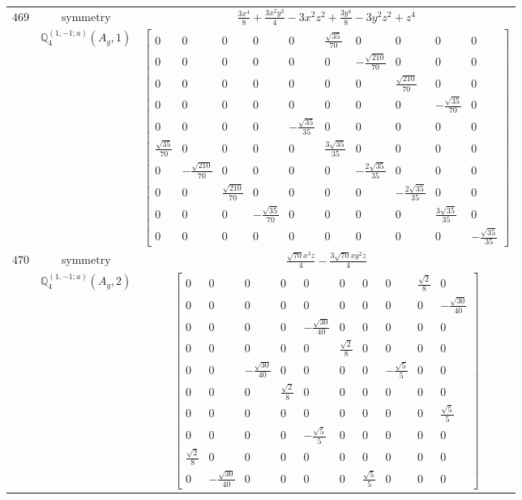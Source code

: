 \documentclass[fleqn,8pt,landscape]{jsarticle}
\begin{document}
\begin{longtable}{ccc}
$ 469 $ & $ \text{symmetry} $ & $ \frac{3 x^{4}}{8} + \frac{3 x^{2} y^{2}}{4} - 3 x^{2} z^{2} + \frac{3 y^{4}}{8} - 3 y^{2} z^{2} + z^{4} $ \\
$  $ & $ \mathbb{Q}_{4}^{(1,-1;a)}(A_{g},1) $ & $ \begin{bmatrix} 0 & 0 & 0 & 0 & 0 & \frac{\sqrt{35}}{70} & 0 & 0 & 0 & 0 \\ 0 & 0 & 0 & 0 & 0 & 0 & - \frac{\sqrt{210}}{70} & 0 & 0 & 0 \\ 0 & 0 & 0 & 0 & 0 & 0 & 0 & \frac{\sqrt{210}}{70} & 0 & 0 \\ 0 & 0 & 0 & 0 & 0 & 0 & 0 & 0 & - \frac{\sqrt{35}}{70} & 0 \\ 0 & 0 & 0 & 0 & - \frac{\sqrt{35}}{35} & 0 & 0 & 0 & 0 & 0 \\ \frac{\sqrt{35}}{70} & 0 & 0 & 0 & 0 & \frac{3 \sqrt{35}}{35} & 0 & 0 & 0 & 0 \\ 0 & - \frac{\sqrt{210}}{70} & 0 & 0 & 0 & 0 & - \frac{2 \sqrt{35}}{35} & 0 & 0 & 0 \\ 0 & 0 & \frac{\sqrt{210}}{70} & 0 & 0 & 0 & 0 & - \frac{2 \sqrt{35}}{35} & 0 & 0 \\ 0 & 0 & 0 & - \frac{\sqrt{35}}{70} & 0 & 0 & 0 & 0 & \frac{3 \sqrt{35}}{35} & 0 \\ 0 & 0 & 0 & 0 & 0 & 0 & 0 & 0 & 0 & - \frac{\sqrt{35}}{35} \end{bmatrix} $ \\ \hline
$ 470 $ & $ \text{symmetry} $ & $ \frac{\sqrt{70} x^{3} z}{4} - \frac{3 \sqrt{70} x y^{2} z}{4} $ \\
$  $ & $ \mathbb{Q}_{4}^{(1,-1;a)}(A_{g},2) $ & $ \begin{bmatrix} 0 & 0 & 0 & 0 & 0 & 0 & 0 & 0 & \frac{\sqrt{2}}{8} & 0 \\ 0 & 0 & 0 & 0 & 0 & 0 & 0 & 0 & 0 & - \frac{\sqrt{30}}{40} \\ 0 & 0 & 0 & 0 & - \frac{\sqrt{30}}{40} & 0 & 0 & 0 & 0 & 0 \\ 0 & 0 & 0 & 0 & 0 & \frac{\sqrt{2}}{8} & 0 & 0 & 0 & 0 \\ 0 & 0 & - \frac{\sqrt{30}}{40} & 0 & 0 & 0 & 0 & - \frac{\sqrt{5}}{5} & 0 & 0 \\ 0 & 0 & 0 & \frac{\sqrt{2}}{8} & 0 & 0 & 0 & 0 & 0 & 0 \\ 0 & 0 & 0 & 0 & 0 & 0 & 0 & 0 & 0 & \frac{\sqrt{5}}{5} \\ 0 & 0 & 0 & 0 & - \frac{\sqrt{5}}{5} & 0 & 0 & 0 & 0 & 0 \\ \frac{\sqrt{2}}{8} & 0 & 0 & 0 & 0 & 0 & 0 & 0 & 0 & 0 \\ 0 & - \frac{\sqrt{30}}{40} & 0 & 0 & 0 & 0 & \frac{\sqrt{5}}{5} & 0 & 0 & 0 \end{bmatrix} $ \\ \hline

\end{longtable}
\end{document}
